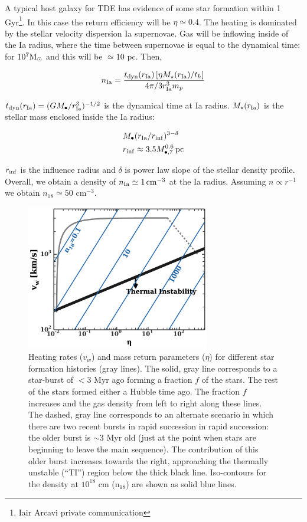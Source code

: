 \documentclass[usenatbib,fleqn]{mnras}
\newcommand{\Mbh}[1][]{M_{\bullet#1}}
\newcommand{\Msun}{{\rm M_\odot}}
\begin{document}
A typical host galaxy for TDE has evidence of some star formation
within 1 Gyr\footnote{Iair Arcavi private communication}. In this case
the return efficiency will be $\eta\simeq 0.4$. The heating is
dominated by the stellar velocity dispersion Ia supernovae.  Gas will
be inflowing inside of the Ia radius, where the time between
supernovae is equal to the dynamical time: for $10^7 \Msun$ and this
will be $\simeq 10$ pc. Then,

\begin{equation}
n_{\rm Ia}=\frac{t_{\rm dyn}(r_{\rm Ia}) \left[\eta M_{\star} (r_{\rm
    Ia})/t_h\right]}{4 \pi/3 r_{\rm Ia}^3 m_p}
\label{eq:nIa}
\end{equation}

$t_{\rm dyn}(r_{\rm Ia})=(G \Mbh/r_{\rm Ia}^3)^{-1/2}$ is the
dynamical time at Ia radius. $M_{\star}(r_{\rm Ia})$ is the stellar
mass enclosed inside the Ia radius:

\begin{align}
&\Mbh (r_{\rm Ia}/r_{\rm inf})^{3-\delta}\\
&r_{\inf}\approx 3.5 \Mbh[,7]^{0.6} \, {\rm pc}
\end{align}

$r_{\rm inf}$ is the influence radius and $\delta$
is power law slope of the stellar density profile. Overall, we obtain
a density of $n_{\rm Ia} \simeq 1 \, {\rm cm}^{-3}$ at the Ia
radius. Assuming $n\propto r^{-1}$ we obtain $n_{18}\simeq 50$ cm$^{-3}$. 

 

\begin{figure} 
  \includegraphics[width=8cm]{cnm_plot.pdf}
  \caption{\label{fig:param} Heating rates ($v_w$) and mass return
    parameters ($\eta$) for different star formation histories (gray
    lines). The solid, gray line corresponds to a star-burst of $<3$ Myr
    ago forming a fraction $f$ of the stars. The rest of the stars
    formed either a Hubble time ago. The fraction $f$ increases and
    the gas density from left to right along these lines. The dashed,
    gray line corresponds to an alternate scenario in which there are
    two recent bursts in rapid succession in rapid succession: the
    older burst is $\sim 3$ Myr old (just at the point when stars are
    beginning to leave the main sequence). The contribution of this
    older burst increases towards the right, approaching the 
    thermally unstable (``TI'') region below the thick black
    line. Iso-contours for the density at $10^{18}$ cm
    ($\mathrm{n_{18}}$) are shown as solid blue lines.}
\end{figure}
\end{document}

